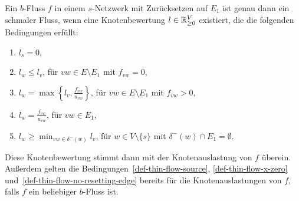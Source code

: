 \begin{lemma}\label{lemma-thin-flow-t-def}
	Ein $b$-Fluss $f$ in einem $s$-Netzwerk mit Zurücksetzen auf $E_1$ ist genau dann ein schmaler Fluss, wenn eine Knotenbewertung $l\in\mathbb{R}_{\geq 0}^V$ existiert, die die folgenden Bedingungen erfüllt:
	\begin{enumerate}[label=(T\arabic*)]
		\item\label{def-thin-flow-source} $\displaystyle l_s = 0$,
		\item\label{def-thin-flow-x-zero} $\displaystyle l_w \leq l_v$, \tabto{4.5cm} für $vw\in E \setminus E_1$ mit $f_{vw}=0$,
		\item\label{def-thin-flow-x-positive} $\displaystyle l_w = \max\left\{ l_v, \frac{f_{vw}}{u_{vw}} \right\}$, \tabto{4.5cm} für $vw\in E\setminus E_1$ mit $f_{vw} > 0$,
		\item\label{def-thin-flow-resetting-edge} $\displaystyle l_w = \frac{f_{vw}}{u_{vw}}$, \tabto{4.5cm} für $vw\in E_1$,
		\item\label{def-thin-flow-no-resetting-edge} $\displaystyle l_w \geq \min_{vw\in \delta^-(w)} l_v$, \tabto{4.5cm} für $w\in V\setminus \{ s \}$ mit $\delta^-(w)\cap E_1 = \emptyset$.
	\end{enumerate}
	Diese Knotenbewertung stimmt dann mit der Knotenauslastung von $f$ überein.
	Außerdem gelten die Bedingungen~\ref{def-thin-flow-source}, \ref{def-thin-flow-x-zero} und~\ref{def-thin-flow-no-resetting-edge} bereits für die Knotenauslastungen von $f$, falls $f$ ein beliebiger $b$-Fluss ist.
\end{lemma}

